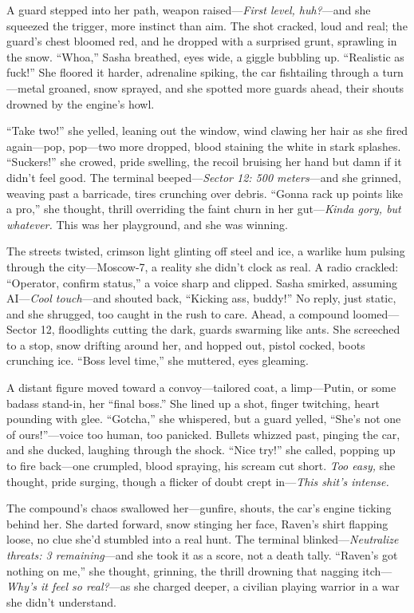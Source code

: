 \documentclass[12pt]{book}
\begin{document}
A guard stepped into her path, weapon raised—\textit{First level, huh?}—and she squeezed the trigger, more instinct than aim. The shot cracked, loud and real; the guard’s chest bloomed red, and he dropped with a surprised grunt, sprawling in the snow. “Whoa,” Sasha breathed, eyes wide, a giggle bubbling up. “Realistic as fuck!” She floored it harder, adrenaline spiking, the car fishtailing through a turn—metal groaned, snow sprayed, and she spotted more guards ahead, their shouts drowned by the engine’s howl.

“Take two!” she yelled, leaning out the window, wind clawing her hair as she fired again—pop, pop—two more dropped, blood staining the white in stark splashes. “Suckers!” she crowed, pride swelling, the recoil bruising her hand but damn if it didn’t feel good. The terminal beeped—\textit{Sector 12: 500 meters}—and she grinned, weaving past a barricade, tires crunching over debris. “Gonna rack up points like a pro,” she thought, thrill overriding the faint churn in her gut—\textit{Kinda gory, but whatever.} This was her playground, and she was winning.

The streets twisted, crimson light glinting off steel and ice, a warlike hum pulsing through the city—Moscow-7, a reality she didn’t clock as real. A radio crackled: “Operator, confirm status,” a voice sharp and clipped. Sasha smirked, assuming AI—\textit{Cool touch}—and shouted back, “Kicking ass, buddy!” No reply, just static, and she shrugged, too caught in the rush to care. Ahead, a compound loomed—Sector 12, floodlights cutting the dark, guards swarming like ants. She screeched to a stop, snow drifting around her, and hopped out, pistol cocked, boots crunching ice. “Boss level time,” she muttered, eyes gleaming.

A distant figure moved toward a convoy—tailored coat, a limp—Putin, or some badass stand-in, her “final boss.” She lined up a shot, finger twitching, heart pounding with glee. “Gotcha,” she whispered, but a guard yelled, “She’s not one of ours!”—voice too human, too panicked. Bullets whizzed past, pinging the car, and she ducked, laughing through the shock. “Nice try!” she called, popping up to fire back—one crumpled, blood spraying, his scream cut short. \textit{Too easy,} she thought, pride surging, though a flicker of doubt crept in—\textit{This shit’s intense.}

The compound’s chaos swallowed her—gunfire, shouts, the car’s engine ticking behind her. She darted forward, snow stinging her face, Raven’s shirt flapping loose, no clue she’d stumbled into a real hunt. The terminal blinked—\textit{Neutralize threats: 3 remaining}—and she took it as a score, not a death tally. “Raven’s got nothing on me,” she thought, grinning, the thrill drowning that nagging itch—\textit{Why’s it feel so real?}—as she charged deeper, a civilian playing warrior in a war she didn’t understand.
\end{document}
